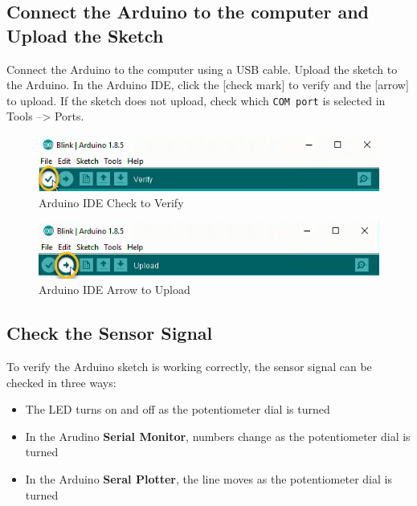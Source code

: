 \documentclass{book}
\makeatletter
\def\maxwidth{\ifdim\Gin@nat@width>\linewidth\linewidth
    \else\Gin@nat@width\fi}
\let\Oldincludegraphics\includegraphics
\renewcommand{\includegraphics}[1]{\Oldincludegraphics[width=.8\maxwidth]{#1}}
\providecommand{\tightlist}{%
      \setlength{\itemsep}{0pt}\setlength{\parskip}{0pt}}
\makeatother
\begin{document}
    \subsection{Connect the Arduino to the computer and Upload the
Sketch}\label{connect-the-arduino-to-the-computer-and-upload-the-sketch}

    Connect the Arduino to the computer using a USB cable. Upload the sketch
to the Arduino. In the Arduino IDE, click the {[}check mark{]} to verify
and the {[}arrow{]} to upload. If the sketch does not upload, check
which \lstinline!COM port! is selected in Tools --\textgreater{} Ports.

\begin{figure}
\centering
\includegraphics{images/Check_to_Verify.png}
\caption{Arduino IDE Check to Verify}
\end{figure}

\begin{figure}
\centering
\includegraphics{images/Arrow_to_Upload.png}
\caption{Arduino IDE Arrow to Upload}
\end{figure}

    \subsection{Check the Sensor Signal}\label{check-the-sensor-signal}

    To verify the Arduino sketch is working correctly, the sensor signal can
be checked in three ways:

\begin{itemize}
\tightlist
\item
  The LED turns on and off as the potentiometer dial is turned
\item
  In the Arudino \textbf{Serial Monitor}, numbers change as the
  potentiometer dial is turned
\item
  In the Arduino \textbf{Seral Plotter}, the line moves as the
  potentiometer dial is turned
\end{itemize}
\end{document}
